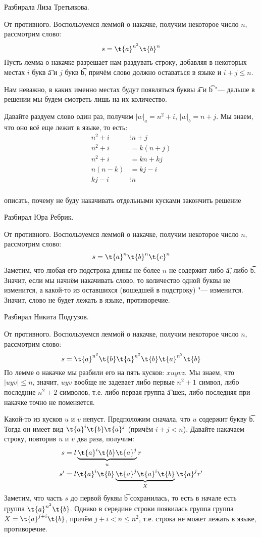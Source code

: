 	\TODO
	Разбирала Лиза Третьякова.

	От противного.
	Воспользуемся леммой о накачке, получим некоторое число $n$, рассмотрим слово:
	\[ s = \t{a}^{n^2}\t{b}^{n} \]
	Пусть лемма о накачке разрешает нам раздувать строку, добавляя в некоторых местах
	$i$ букв \t{a} и $j$ букв \t{b}, причём слово должно оставаться в языке и $i+j \le n$.
	\begin{Rem}
		Нам неважно, в каких именно местах будут появляться буквы \t{a} и \t{b} "---
		дальше в решении мы будем смотреть лишь на их количество.
	\end{Rem}
	Давайте раздуем слово один раз, получим $|w|_a=n^2+i$, $|w|_b=n+j$.
	Мы знаем, что оно всё еще лежит в языке, то есть:
	\begin{align*}
		n^2 + i &\vdots n + j \\
		n^2 + i &= k(n + j) \\
		n^2 + i &= kn + kj \\
		n(n-k) &= kj - i \\
		kj - i &\vdots n \\
	\end{align*}

	\TODO описать, почему не буду накачивать отдельными кусками
	\TODO закончить решение

	Разбирал Юра Ребрик.

	От противного.
	Воспользуемся леммой о накачке, получим некоторое число $n$, рассмотрим слово:
	\[ s = \t{a}^n\t{b}^n\t{c}^n \]
	Заметим, что любая его подстрока длины не более $n$ не содержит либо \t{a}, либо \t{b}.
	Значит, если мы начнём накачивать слово, то количество одной буквы не изменится, а какой-то из оставшихся (вошедшей в подстроку) "--- изменится.
	Значит, слово не будет лежать в языке, противоречие.

	Разбирал Никита Подгузов.

	От противного.
	Воспользуемся леммой о накачке, получим некоторое число $n$, рассмотрим слово:
	\[ s = \t{a}^{n^2}\t{b}\t{a}^{n^2}\t{b}\t{a}^{n^2}\t{b} \]
	По лемме о накачке мы разбили его на пять кусков: $xuyvz$.
	Мы знаем, что $|uyv|\le n$, значит, $uyv$ вообще не задевает либо первые $n^2+1$ символ,
	либо последние $n^2+2$ символов, т.е. либо первая группа \t{a}-шек, либо последняя при накачке точно не поменяется.

	Какой-то из кусков $u$ и $v$ непуст.
	Предположим сначала, что $u$ содержит букву \t{b}.
	Тогда он имеет вид $\t{a}^i\t{b}\t{a}^j$ (причём $i+j<n$).
	Давайте накачаем строку, повторив $u$ и $v$ два раза, получим:
	\begin{align*}
		s &= l \underbrace{\t{a}^i\t{b}\t{a}^j}_u r \\
		s' &= l \t{a}^i\t{b}\underbrace{\t{a}^j \t{a}^i\t{b}}_X\t{a}^j r'
	\end{align*}
	Заметим, что часть $s$ до первой буквы \t{b} сохранилась, то есть в начале есть
	группа $\t{a}^{n^2}\t{b}$.
	Однако в середине строки появилась группа группа $X=\t{a}^{j+i}\t{b}$,
	причём $j+i <n \le n^2$, т.е. строка не может лежать в языке, противоречие.

